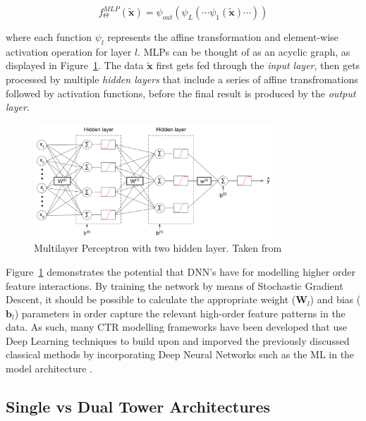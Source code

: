 \documentclass{mldsmsc}
\begin{document}
\begin{equation}
\label{eqn:mlp-2}
f_{\Theta}^{MLP}(\tilde{\mathbf{x}}) = \psi_{out} \left( \psi_{L} \left( \cdots \psi_{1} \left( 
    \tilde{\mathbf{x}} \right) \cdots \right) \right)
\end{equation}

where each function $\psi_{l}$ represents the affine transformation and element-wise activation
operation for layer $l$. MLPs can be thought of as an acyclic graph, as displayed in
Figure~\ref{fig:mlp}. The data $\tilde{\mathbf{x}}$ first gets fed through the
\emph{input layer}, then gets processed by multiple \emph{hidden layers} that include
a series of affine transfromations followed by activation functions, before the final
result is produced by the \emph{output layer}.

\begin{figure}[h]
    \centering
    \includegraphics[width=0.8\textwidth]{../figures/ann_two_hidden_layers.png}
    \caption{Multilayer Perceptron with two hidden layer. Taken from \citep{RefWorks:webster2024week}}
    \label{fig:mlp}
\end{figure}

Figure~\ref{fig:mlp} demonstrates the potential that DNN's have for modelling higher order feature
interactions. By training the network by means of Stochastic Gradient Descent, it should be
possible to calculate the appropriate weight ($\mathbf{W}_l$) and bias ($\mathbf{b}_l$) parameters
in order capture the relevant high-order feature patterns in the data. As such, many CTR
modelling frameworks have been developed that use Deep Learning techniques to build upon and
imporved the previously discussed classical methods by incorporating Deep Neural Networks such
as the ML in the model architecture \citep{RefWorks:zhang2021deep}.

\subsection{Single vs Dual Tower Architectures}
\end{document}
